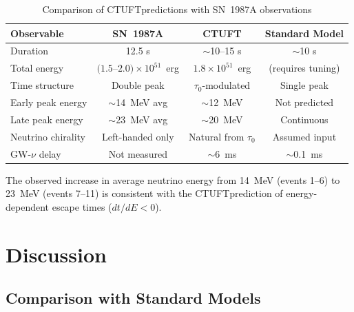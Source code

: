\documentclass[twocolumn, tightenlines, showpacs, showkeys, nofootinbib]{revtex4-1}
\newcommand{\ctuft}{\textsc{CTUFT}}
\newcommand{\tauzero}{\tau_0}
\begin{document}
\begin{table}[t]
    \centering
    \caption{Comparison of \ctuft predictions with SN~1987A observations}
    \label{tab:sn1987a}
    \begin{tabular}{lccc}
        \toprule
        Observable & SN~1987A & \ctuft & Standard Model \\
        \midrule
        Duration & 12.5 s & $\sim$10--15 s & $\sim$10 s \\
        Total energy & $(1.5$--$2.0)\times10^{51}$~erg & $1.8\times10^{51}$~erg & 
                      (requires tuning) \\
        Time structure & Double peak & $\tauzero$-modulated & Single peak \\
        Early peak energy & $\sim$14~MeV avg & $\sim$12~MeV & Not predicted \\
        Late peak energy & $\sim$23~MeV avg & $\sim$20~MeV & Continuous \\
        Neutrino chirality & Left-handed only & Natural from $\tauzero$ & 
                            Assumed input \\
        GW-$\nu$ delay & Not measured & $\sim$6~ms & $\sim$0.1~ms \\
        \bottomrule
    \end{tabular}
\end{table}

The observed increase in average neutrino energy from 14~MeV (events 1--6) 
to 23~MeV (events 7--11) is consistent with the \ctuft prediction of 
energy-dependent escape times ($dt/dE < 0$).

\section{Discussion}

\subsection{Comparison with Standard Models}
\end{document}
